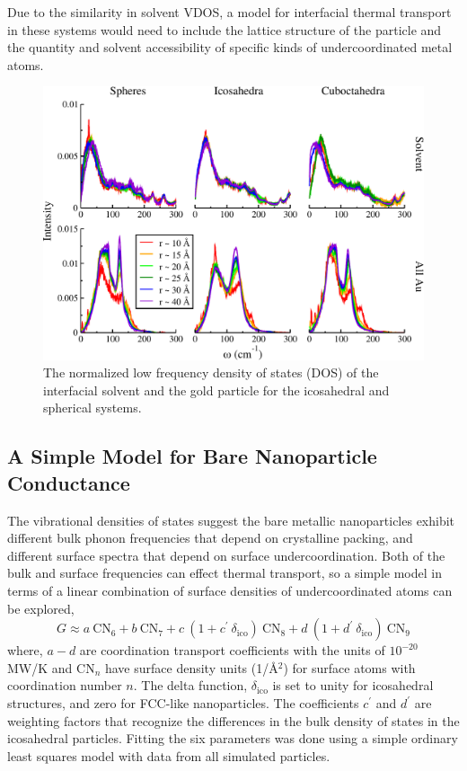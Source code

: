 Due to the similarity in solvent VDOS, a model for interfacial 
thermal transport in these
systems would need to include the lattice structure of the particle
and the quantity and solvent accessibility of specific kinds of
undercoordinated metal atoms.

\begin{figure}[!htb]
        \includegraphics[width=5in]{figures/all-spect.pdf}
        \caption{The normalized low frequency density of states (DOS)
          of the interfacial solvent and the gold particle for the
          icosahedral and spherical systems. }
        \label{fig:all-spect}
\end{figure}

\subsection{A Simple Model for Bare Nanoparticle Conductance}
The vibrational densities of states suggest the bare metallic
nanoparticles exhibit different bulk phonon frequencies that depend on
crystalline packing, and different surface spectra that depend on
surface undercoordination.  Both of the bulk and surface frequencies
can effect thermal transport, so a simple model in terms of a linear 
combination of surface densities of undercoordinated atoms can be explored,
\begin{equation}
G \approx a~\mathrm{CN}_{6} + b~\mathrm{CN}_{7} + c~\left(1+c^{\prime}~\delta_\mathrm{ico}\right)~\mathrm{CN}_{8} + d~\left( 1 + d^{\prime}~\delta_\mathrm{ico} \right)~\mathrm{CN}_{9}
\label{eq:lin-fit}
\end{equation}
where, $a - d$ are coordination transport coefficients with the units
of $10^{-20}$ MW/K and $\mathrm{CN}_{n}$ have surface density units
(1/\AA $^2$) for surface atoms with coordination number $n$.  The
delta function, $\delta_\mathrm{ico}$ is set to unity for icosahedral
structures, and zero for FCC-like nanoparticles.  The coefficients
$c^{\prime}$ and $d^{\prime}$ are weighting factors that recognize the
differences in the bulk density of states in the icosahedral
particles.  Fitting the six parameters was done using a simple
ordinary least squares model with data from all simulated particles.

